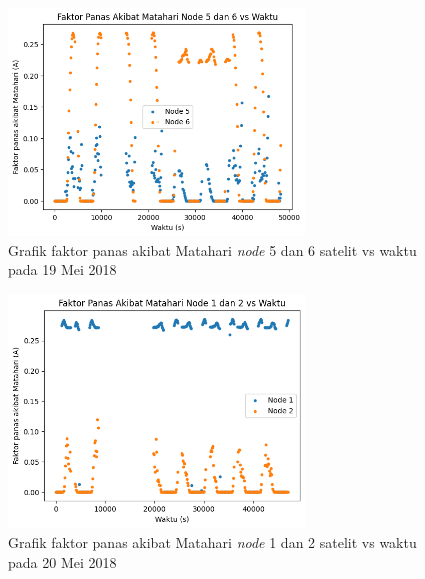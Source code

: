 \begin{figure}[H]
\setlength{}
\begin{center}
\includegraphics[width=0.7\textwidth]{fig/solar_node56_2018-05-19.png}
	\caption{Grafik faktor panas akibat Matahari \textit{node} 5 dan 6 satelit vs waktu pada 19 Mei 2018}
\label{fig:solar5619}
\end{center}
\end{figure}

\begin{figure}[H]
\setlength{}
\begin{center}
\includegraphics[width=0.7\textwidth]{fig/solar_node12_2018-05-20.png}
	\caption{Grafik faktor panas akibat Matahari \textit{node} 1 dan 2 satelit vs waktu pada 20 Mei 2018}
\label{fig:solar1220}
\end{center}
\end{figure}

